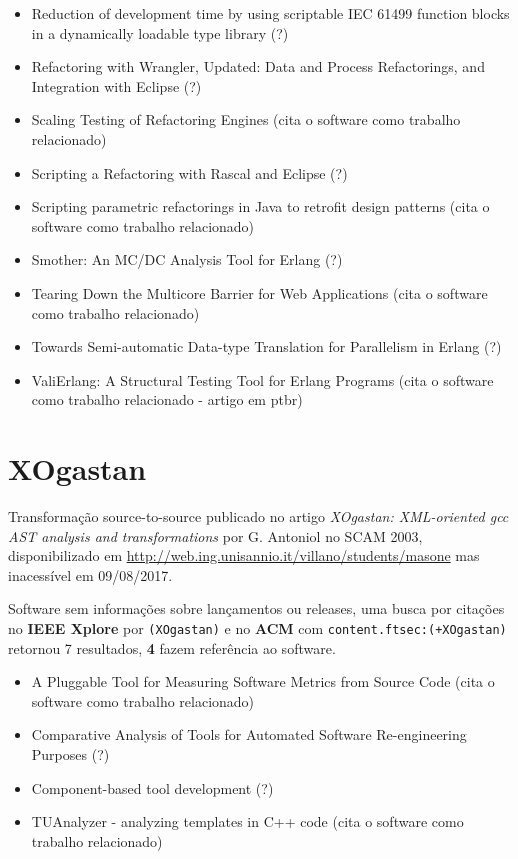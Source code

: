 \begin{itemize}
\item Reduction of development time by using scriptable IEC 61499 function blocks in a dynamically loadable type library (?)
\item Refactoring with Wrangler, Updated: Data and Process Refactorings, and Integration with Eclipse (?)
\item Scaling Testing of Refactoring Engines (cita o software como trabalho relacionado)
\item Scripting a Refactoring with Rascal and Eclipse (?)
\item Scripting parametric refactorings in Java to retrofit design patterns (cita o software como trabalho relacionado)
\item Smother: An MC/DC Analysis Tool for Erlang (?)
\item Tearing Down the Multicore Barrier for Web Applications (cita o software como trabalho relacionado)
\item Towards Semi-automatic Data-type Translation for Parallelism in Erlang (?)
\item ValiErlang: A Structural Testing Tool for Erlang Programs (cita o software como trabalho relacionado - artigo em ptbr)
\end{itemize}

\section{XOgastan}

Transformação source-to-source
publicado no artigo {\it XOgastan: XML-oriented gcc AST analysis and transformations}
por G. Antoniol
no SCAM 2003,
disponibilizado em \url{http://web.ing.unisannio.it/villano/students/masone}
mas inacessível em 09/08/2017.

Software sem informações sobre lançamentos ou releases,
uma busca por citações no {\bf IEEE Xplore} por
\texttt{(XOgastan)}
e no {\bf ACM} com
\texttt{content.ftsec:(+XOgastan)}
retornou
7 resultados,
{\bf 4} fazem referência ao software.

\begin{itemize}
\item A Pluggable Tool for Measuring Software Metrics from Source Code (cita o software como trabalho relacionado)
\item Comparative Analysis of Tools for Automated Software Re-engineering Purposes (?)
\item Component-based tool development (?)
\item TUAnalyzer - analyzing templates in C++ code (cita o software como trabalho relacionado)
\end{itemize}



